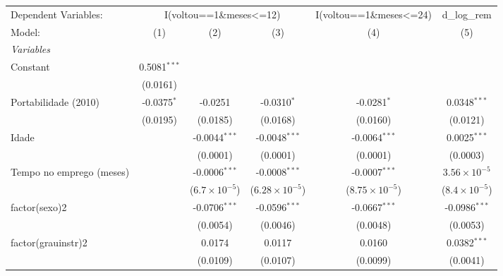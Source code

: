 
\begingroup
\centering
\begin{tabular}{lccccc}
   \tabularnewline \midrule \midrule
   Dependent Variables: & \multicolumn{3}{c}{I(voltou==1\&meses<=12)} & I(voltou==1\&meses<=24) & d\_log\_rem\\
   Model:                   & (1)            & (2)                    & (3)                     & (4)                     & (5)\\  
   \midrule
   \emph{Variables}\\
   Constant                 & 0.5081$^{***}$ &                        &                         &                         &   \\   
                            & (0.0161)       &                        &                         &                         &   \\   
   Portabilidade (2010)     & -0.0375$^{*}$  & -0.0251                & -0.0310$^{*}$           & -0.0281$^{*}$           & 0.0348$^{***}$\\   
                            & (0.0195)       & (0.0185)               & (0.0168)                & (0.0160)                & (0.0121)\\   
   Idade                    &                & -0.0044$^{***}$        & -0.0048$^{***}$         & -0.0064$^{***}$         & 0.0025$^{***}$\\   
                            &                & (0.0001)               & (0.0001)                & (0.0001)                & (0.0003)\\   
   Tempo no emprego (meses) &                & -0.0006$^{***}$        & -0.0008$^{***}$         & -0.0007$^{***}$         & $3.56\times 10^{-5}$\\    
                            &                & ($6.7\times 10^{-5}$)  & ($6.28\times 10^{-5}$)  & ($8.75\times 10^{-5}$)  & ($8.4\times 10^{-5}$)\\    
   factor(sexo)2            &                & -0.0706$^{***}$        & -0.0596$^{***}$         & -0.0667$^{***}$         & -0.0986$^{***}$\\   
                            &                & (0.0054)               & (0.0046)                & (0.0048)                & (0.0053)\\   
   factor(grauinstr)2       &                & 0.0174                 & 0.0117                  & 0.0160                  & 0.0382$^{***}$\\   
                            &                & (0.0109)               & (0.0107)                & (0.0099)                & (0.0041)\\   

\end{tabular}
